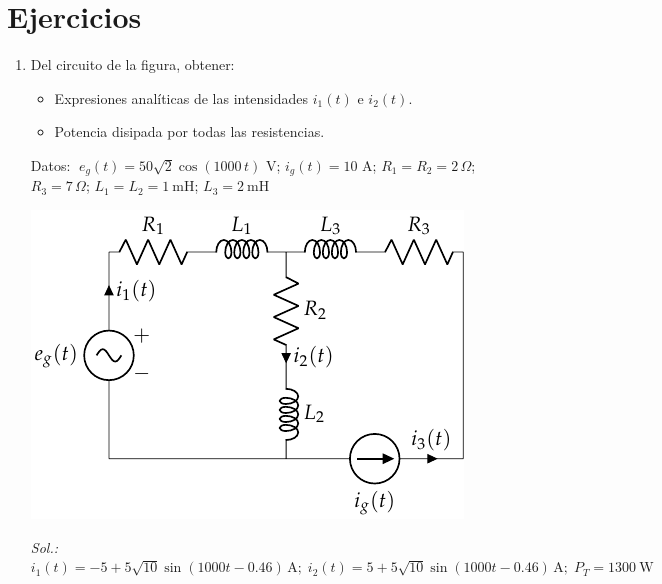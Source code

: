 \section*{Ejercicios}

\begin{enumerate}

  \item Del circuito de la figura, obtener:
  \begin{itemize}
  \item Expresiones analíticas de las intensidades $i_1(t)$ e $i_2(t)$.
  \item Potencia disipada por todas las resistencias.
  \end{itemize}

  Datos: $\; e_g(t)=50\sqrt{2} \cos(1000\,t)$ V; \hspace{2mm}$i_g(t)=10$ A; \hspace{2mm}
$R_1=R_2=2\,\Omega$; \hspace{2mm} $R_3=7\,\Omega$; \hspace{2mm} $L_1=L_2=\qty{1}{\milli\henry}$; \hspace{2mm} $L_3=\qty{2}{\milli\henry}$
  \begin{center}
    \includegraphics{../figs/ej18_BT2.pdf}
  \end{center}
  \emph{Sol.:\; 
    $i_1(t)= -5+5\sqrt{10}\sin(1000t-0.46) \,\si{\ampere};\; i_2(t)=
    5+5\sqrt{10}\sin(1000t-0.46) \,\si{\ampere};\; P_T=\qty{1300}{\watt}$}


\end{enumerate}
